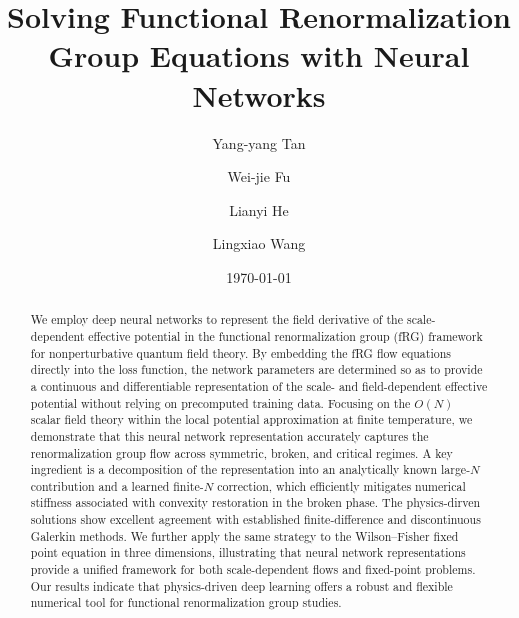\documentclass[reprint,twocolumn,superscriptaddress,preprintnumbers,amsmath,amssymb,aps,prd,floatfix]{revtex4-2}
\newcommand{\gettitle}{Solving Functional Renormalization Group Equations with Neural Networks}
\begin{document}


\title{\gettitle}
\author{Yang-yang Tan}

\author{Wei-jie Fu}

\author{Lianyi He}

\author{Lingxiao Wang}

\date{\today}


\begin{abstract}
We employ deep neural networks to represent the field derivative of the scale-dependent effective potential in the functional renormalization group (fRG) framework for nonperturbative quantum field theory. By embedding the fRG flow equations directly into the loss function, the network parameters are determined so as to provide a continuous and differentiable representation of the scale- and field-dependent effective potential without relying on precomputed training data. Focusing on the $O(N)$ scalar field theory within the local potential approximation at finite temperature, we demonstrate that this neural network representation accurately captures the renormalization group flow across symmetric, broken, and critical regimes. A key ingredient is a decomposition of the representation into an analytically known large-$N$ contribution and a learned finite-$N$ correction, which efficiently mitigates numerical stiffness associated with convexity restoration in the broken phase. The physics-dirven solutions show excellent agreement with established finite-difference and discontinuous Galerkin methods. We further apply the same strategy to the Wilson–Fisher fixed point equation in three dimensions, illustrating that neural network representations provide a unified framework for both scale-dependent flows and fixed-point problems. Our results indicate that physics-driven deep learning offers a robust and flexible numerical tool for functional renormalization group studies.
\end{abstract}
\end{document}
